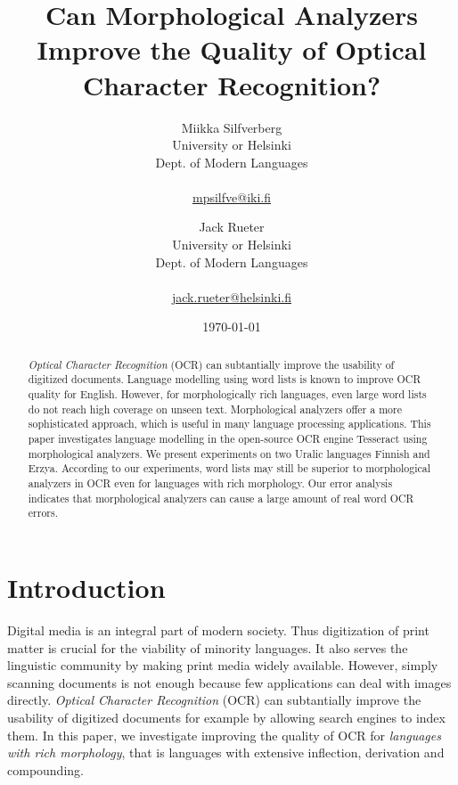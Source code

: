 \documentclass[b5paper]{article}
\begin{document}
\title{Can Morphological Analyzers Improve the Quality of Optical Character Recognition?}

\author{Miikka Silfverberg\\
University or Helsinki\\
Dept. of Modern Languages\\
\\
\url{mpsilfve@iki.fi} \and
Jack Rueter\\
University or Helsinki\\
Dept. of Modern Languages\\
\\
\url{jack.rueter@helsinki.fi} 
}

\date{\today}

\maketitle

\begin{abstract}
  {\it Optical Character Recognition} (OCR) can subtantially improve
  the usability of digitized documents. Language modelling using word
  lists is known to improve OCR quality for English. However, for
  morphologically rich languages, even large word lists do not reach
  high coverage on unseen text. Morphological analyzers offer a more
  sophisticated approach, which is useful in many language processing
  applications. This paper investigates language modelling in the
  open-source OCR engine Tesseract using morphological analyzers. We
  present experiments on two Uralic languages Finnish and
  Erzya. According to our experiments, word lists may still be
  superior to morphological analyzers in OCR even for languages with
  rich morphology. Our error analysis indicates that morphological
  analyzers can cause a large amount of real word OCR errors.
\end{abstract}

\section{Introduction}

Digital media is an integral part of modern society. Thus digitization
of print matter is crucial for the viability of minority languages. It
also serves the linguistic community by making print media widely
available. However, simply scanning documents is not enough because
few applications can deal with images directly. {\it Optical Character
  Recognition} (OCR) can subtantially improve the usability of
digitized documents for example by allowing search engines to index
them. In this paper, we investigate improving the quality of OCR for
{\it languages with rich morphology}, that is languages with extensive
inflection, derivation and compounding.
\end{document}
